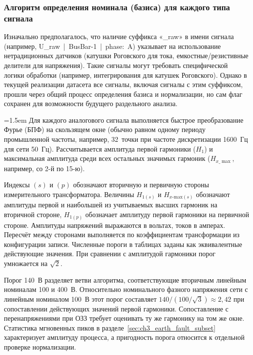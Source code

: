 \subsubsection{Алгоритм определения номинала (базиса) для каждого типа сигнала}\label{sec:ch3_basis_determination_algorithm}

Изначально предполагалось, что наличие суффикса «\_raw» в имени сигнала (например,
U\_raw~|~BusBar-1~|~phase:~A) указывает на использование нетрадиционных датчиков
(катушки Роговского для тока, емкостные/резистивные делители для напряжения). Такие
сигналы могут требовать специфической логики обработки (например, интегрирования для
катушек Роговского). Однако в текущей реализации датасета все сигналы, включая сигналы с
этим суффиксом, прошли через общий процесс определения базиса и нормализации, но сам
флаг сохранен для возможности будущего раздельного анализа.

{\emergencystretch=1.5em Для каждого аналогового сигнала выполняется быстрое преобразование Фурье (БПФ) на скользящем окне (обычно равном одному периоду промышленной частоты, например, 32~точки при частоте дискретизации 1600~Гц для сети 50~Гц). Рассчитывается амплитуда первой гармоники ($H_1$) и максимальная амплитуда среди всех остальных значимых гармоник ($H_{x\text{\_}\max}$, например, со 2-й по 15-ю).\par}

Индексы $(s)$ и $(p)$ обозначают вторичную и первичную стороны измерительного
трансформатора. Величины $H_{1(s)}$ и $H_{x\text{-max}(s)}$ обозначают амплитуды первой
и наибольшей из учитываемых высших гармоник на вторичной стороне, $H_{1(p)}$ обозначает
амплитуду первой гармоники на первичной стороне. Амплитуды напряжений выражаются в
вольтах, токов в амперах. Пересчёт между сторонами выполняется по коэффициентам
трансформации из конфигурации записи. Численные пороги в таблицах заданы как
эквивалентные действующие значения. При сравнении с амплитудой гармоники порог
умножается на $\sqrt 2$.

Порог 140~В разделяет ветви алгоритма, соответствующие вторичным линейным номиналам 100 и 400~В. Относительно номинального фазного напряжения сети с линейным номиналом 100~В этот порог составляет $140/(100/\sqrt 3)\approx 2{,}42$ при сопоставлении действующих значений первой гармоники. Сопоставление с перенапряжениями при ОЗЗ требует оценивать ту же гармонику на том же окне. Статистика мгновенных пиков в разделе~\ref{sec:ch3_earth_fault_subset} характеризует амплитуду процесса, а пригодность порога относится к отдельной проверке нормализации.

